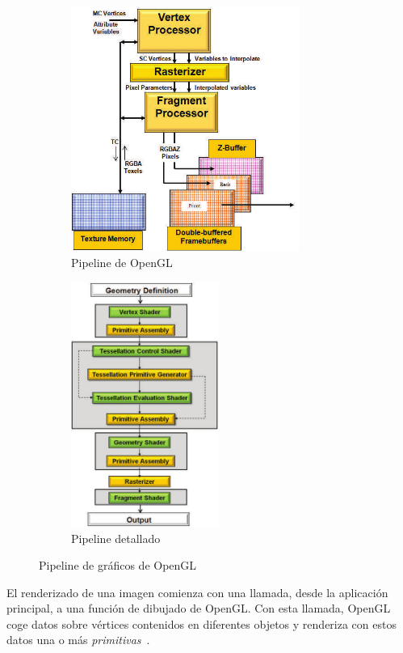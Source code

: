 \begin{figure}[h]%
	\begin{subfigure}[b]{.5\textwidth}
		\centering
		\includegraphics[height=8cm]{figures/pipeline.png}
		\caption{Pipeline de OpenGL}
		\label{fig2.2a}
	\end{subfigure}
	\begin{subfigure}[b]{.5\textwidth}
		\centering
		\includegraphics[height=8cm]{figures/pipelineExtendido.png}
		\caption{Pipeline detallado}
		\label{fig2.2b}
	\end{subfigure}
	\caption{Pipeline de gráficos de OpenGL}
	\label{fig2.2}
\end{figure}

El renderizado de una imagen comienza con una llamada, desde la aplicación
principal, a una función de dibujado de OpenGL. Con esta llamada, OpenGL coge
datos sobre vértices contenidos en diferentes objetos y renderiza con estos
datos una o más \textit{primitivas}~\cite{Primitivas}. \\

